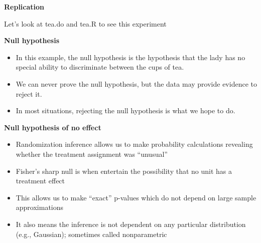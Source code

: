 \documentclass[notes=show]{beamer}
\begin{document}
\begin{frame}[plain]
\begin{center}
\textbf{Replication}
\end{center}

Let's look at tea.do and tea.R to see this experiment

\end{frame}


\begin{frame}[plain]

	\begin{center}
	\textbf{Null hypothesis}
	\end{center}
	
	\begin{itemize}
	\item In this example, the null hypothesis is the hypothesis that the lady has no special ability to discriminate between the cups of tea.
	\item We can never prove the null hypothesis, but the data may provide evidence to reject it.
	\item In most situations, rejecting the null hypothesis is what we hope to do.

	\end{itemize}
\end{frame}



\begin{frame}[plain]
\begin{center}
\textbf{Null hypothesis of no effect}
\end{center}

\begin{itemize}
\item Randomization inference allows us to make probability calculations revealing whether the treatment assignment was ``unusual''
\item Fisher's sharp null is when entertain the possibility that no unit has a treatment effect
\item This allows us to make ``exact'' p-values which do not depend on large sample approximations
\item It also means the inference is not dependent on any particular distribution (e.g., Gaussian); sometimes called nonparametric
\end{itemize}

\end{frame}
\end{document}
